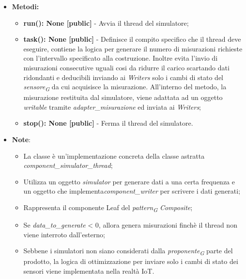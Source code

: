 \begin{itemize}
\begin{itemize}
        \item \textbf{Metodi:}
        \begin{itemize}
            \item \textbf{run(): None [public]} - Avvia il thread del simulatore;
            \item \textbf{task(): None [public]} - Definisce il compito specifico che il thread deve eseguire, contiene la logica per generare il numero di misurazioni richieste con l'intervallo specificato alla costruzione.
            Inoltre evita l'invio di misurazioni consecutive uguali cosi da ridurre il carico scartando dati ridondanti e deducibili inviando ai \textit{Writers} solo i cambi di stato del \textit{sensore}\textsubscript{\textit{G}} da cui acquisisce la misurazione.
            All'interno del metodo, la misurazione restituita dal simulatore, viene adattata ad un oggetto \textit{writable} tramite \textit{adapter\_misurazione} ed inviata ai \textit{Writers};
            \item \textbf{stop(): None [public]} - Ferma il thread del simulatore.
        \end{itemize}
        \item\textbf{Note}:
        \begin{itemize}
            \item La classe è un'implementazione concreta della classe astratta \textit{component\_simulator\_thread};
            \item Utilizza un oggetto \textit{\textit{simulator}} per generare dati a una certa frequenza e un oggetto che implementa\textit{component\_writer} per scrivere i dati generati;
            \item Rappresenta il componente Leaf del \textit{pattern}\textsubscript{\textit{G}} \textit{Composite};
            \item Se \textit{data\_to\_generate} < 0, allora genera misurazioni finchè il thread non viene interroto dall'esterno;
            \item Sebbene i simulatori non siano considerati dalla \textit{proponente}\textsubscript{\textit{G}} parte del prodotto, la logica di ottimizzazione per inviare solo i cambi di stato dei sensori viene implementata nella realtà IoT.
            

\end{itemize}
\end{itemize}
\end{itemize}
